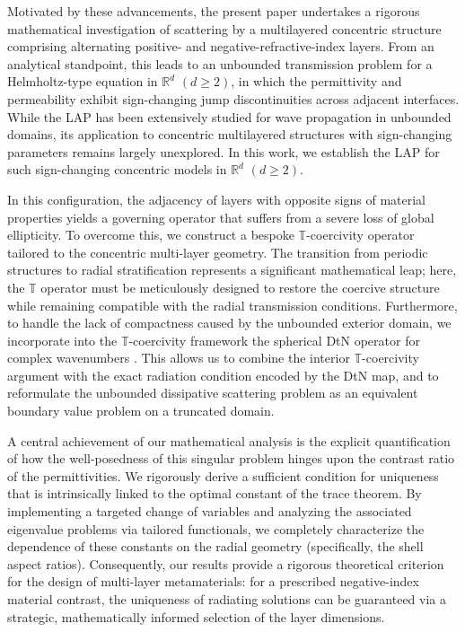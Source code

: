 \documentclass[12pt,reqno]{amsart}
\numberwithin{equation}{section}
\begin{document}
Motivated by these advancements, the present paper undertakes a rigorous mathematical investigation of scattering by a multilayered concentric structure comprising alternating positive- and negative-refractive-index layers. From an analytical standpoint, this leads to an unbounded transmission problem for a Helmholtz-type equation in $\mathbb{R}^d$ $(d \ge 2)$, in which the permittivity and permeability exhibit sign-changing jump discontinuities across adjacent interfaces. While the LAP has been extensively studied for wave propagation in unbounded domains, its application to concentric multilayered structures with sign-changing parameters remains largely unexplored. In this work, we establish the LAP for such sign-changing concentric models in $\mathbb{R}^d$ $(d \ge 2)$.



In this configuration, the adjacency of layers with opposite signs of material properties yields a governing operator that suffers from a severe loss of global ellipticity. To overcome this, we construct a bespoke $\mathbb{T}$-coercivity operator tailored to the concentric multi-layer geometry. The transition from periodic structures to radial stratification represents a significant mathematical leap; here, the $\mathbb{T}$ operator must be meticulously designed to restore the coercive structure while remaining compatible with the radial transmission conditions. Furthermore, to handle the lack of compactness caused by the unbounded exterior domain, we incorporate into the $\mathbb{T}$-coercivity framework the spherical DtN operator for complex wavenumbers \cite{gräßle2025}. This allows us to combine the interior $\mathbb{T}$-coercivity argument with the exact radiation condition encoded by the DtN map, and to reformulate the unbounded dissipative scattering problem as an equivalent boundary value problem on a truncated domain.




A central achievement of our mathematical analysis is the explicit quantification of how the well-posedness of this singular problem hinges upon the contrast ratio of the permittivities. We rigorously derive a sufficient condition for uniqueness that is intrinsically linked to the optimal constant of the  trace theorem. By implementing a targeted change of variables and analyzing the associated eigenvalue problems via tailored functionals, we completely characterize the dependence of these constants on the radial geometry (specifically, the shell aspect ratios). Consequently, our results provide a rigorous theoretical criterion for the design of multi-layer metamaterials: for a prescribed negative-index material contrast, the uniqueness of radiating solutions can be guaranteed via a strategic, mathematically informed selection of the layer dimensions.
\end{document}
